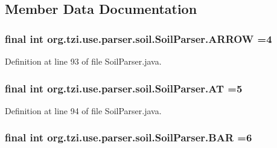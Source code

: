 \subsection{Member Data Documentation}
\hypertarget{classorg_1_1tzi_1_1use_1_1parser_1_1soil_1_1_soil_parser_a2a756d3b37556356e15efcb7e79ca27a}{
\subsubsection[{A\-R\-R\-O\-W}]{\setlength{\rightskip}{0pt plus 5cm}final int org.\-tzi.\-use.\-parser.\-soil.\-Soil\-Parser.\-A\-R\-R\-O\-W =4\hspace{0.3cm}{\ttfamily [static]}}}\label{classorg_1_1tzi_1_1use_1_1parser_1_1soil_1_1_soil_parser_a2a756d3b37556356e15efcb7e79ca27a}


Definition at line 93 of file Soil\-Parser.\-java.

\hypertarget{classorg_1_1tzi_1_1use_1_1parser_1_1soil_1_1_soil_parser_a8a1c7b60ae3b9490e4740f629a5f675e}{
\subsubsection[{A\-T}]{\setlength{\rightskip}{0pt plus 5cm}final int org.\-tzi.\-use.\-parser.\-soil.\-Soil\-Parser.\-A\-T =5\hspace{0.3cm}{\ttfamily [static]}}}\label{classorg_1_1tzi_1_1use_1_1parser_1_1soil_1_1_soil_parser_a8a1c7b60ae3b9490e4740f629a5f675e}


Definition at line 94 of file Soil\-Parser.\-java.

\hypertarget{classorg_1_1tzi_1_1use_1_1parser_1_1soil_1_1_soil_parser_a17f84816fb78f6cc2413246259844e7e}{
\subsubsection[{B\-A\-R}]{\setlength{\rightskip}{0pt plus 5cm}final int org.\-tzi.\-use.\-parser.\-soil.\-Soil\-Parser.\-B\-A\-R =6\hspace{0.3cm}{\ttfamily [static]}}}\label{classorg_1_1tzi_1_1use_1_1parser_1_1soil_1_1_soil_parser_a17f84816fb78f6cc2413246259844e7e}


